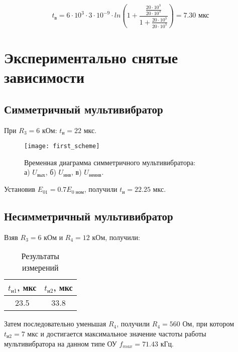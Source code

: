\begin{displaymath}
	t_{\text{в}} = 6 \cdot 10^3 \cdot 3 \cdot 10^{-9} \cdot ln\left(1 + \frac{\frac{20 \cdot 10^3}{20 \cdot 10^3}}{1 + \frac{20 \cdot 10^3}{20 \cdot 10^3}}\right) = 7.30 \text{ мкс}
\end{displaymath}

\newpage

\section{Экспериментально снятые зависимости}

\subsection{Симметричный мультивибратор}

При $R_3 = 6$ кОм: $t_\text{и} = 22$ мкс.

\begin{figure}[H]
\begin{center}
	\texttt{[image: first\_scheme]}
	\captionsetup{margin=0cm}
	\caption{Временная диаграмма симметричного мультивибратора:\\ а) $U_\text{вых}$, б) $U_\text{инв}$, в) $U_\text{неинв}$.} 
	\label{fig:diff}
\end{center}
\end{figure}

Установив $E_{01} = 0.7 E_\text{0\ ном}$, получили $t_\text{и} = 22.25$ мкс.

\subsection{Несимметричный мультивибратор}

Взяв $R_3 = 6$ кОм и $R_4 = 12$ кОм, получили:

\begin{table}[H]
\begin{center}
	\caption{Результаты измерений}
	\def\tabcolsep{10pt}
	\begin{tabular}{|c|c|}
		\hline
		$t_{\text{и1}}$, мкс &
		$t_{\text{и2}}$, мкс \\
		\hline
		23.5 &
		33.8 \\
	    \hline	
	\end{tabular}
\end{center}
\end{table}

Затем последовательно уменьшая $R_4$, получили $R_4 = 560$ Ом, при котором $t_{\text{и2}} = 7$ мкс и достигается максимальное значение частоты работы мультивибратора на данном типе ОУ $f_{max} = 71.43$ кГц.

